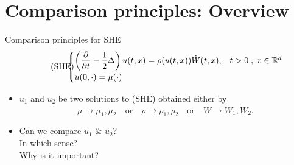 \documentclass[9pt,table,xcolor=dvipsnames]{beamer}%
\newcommand{\R}{\mathbb{R}}
\theoremstyle{definition}
\theoremstyle{plain}
\begin{document}
\section{Comparison principles: Overview}
\begin{frame}{Comparison principles for SHE}
  \begin{align}\tag{SHE}
    \label{E:FracHt}
    \hspace{-1em}
    \begin{cases}
      \left(\displaystyle\frac{\partial}{\partial t} -\frac{1}{2}\Delta \right) u(t,x) = \rho(u(t,x))  \dot{W}(t,x),& t>0\;,\: x\in\R^d\\[0.5em]
      u(0,\cdot) = \mu(\cdot)
    \end{cases}
  \end{align}
  \vfill
  \begin{itemize}
    \item[Let]  $u_1$ and $u_2$ be two solutions to (SHE) obtained either by
    \[
      \mu     \rightarrow \mu_1,\mu_2         \quad\text{or}\quad
      \rho    \rightarrow \rho_1,\rho_2       \quad\text{or}\quad
      \dot{W} \rightarrow \dot{W}_1,\dot{W}_2 .
    \]
    \vfill
    \item[Question]  Can we compare $u_1$ \& $u_2$?\\[1em]
    In which sense?\\[1em]
    Why is it important?
  \end{itemize}
\end{frame}
\end{document}
